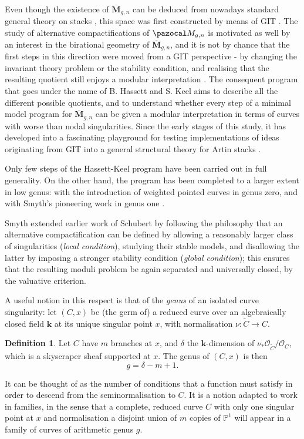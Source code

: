 \documentclass[11pt]{amsart}
\newcommand{\PP}{\mathbb P}
\renewcommand{\k}{\mathbf k}
\newcommand{\OO}{\mathcal O}
\renewcommand{\to}{\rightarrow}
\theoremstyle{plain}
\theoremstyle{definition}
\newtheorem{dfn}[thm]{Definition}
\begin{document}
Even though the existence of $\overline{\mathbf M}_{g,n}$ can be deduced from nowadays standard general theory on stacks \cite{KM}, this space was first constructed by means of GIT \cite{Gieseker,GIT,BalSwi}. The study of alternative compactifications of $\pazocal M_{g,n}$ is motivated as well by an interest in the birational geometry of $\overline{\mathbf M}_{g,n}$, and it is not by chance that the first steps in this direction were moved from a GIT perspective - by changing the invariant theory problem or the stability condition, and realising that the resulting quotient still enjoys a modular interpretation \cite{Schubert,Hassettg2}. The consequent program that goes under the name of B. Hassett and S. Keel aims to describe all the different possible quotients, and to understand whether every step of a minimal model program for $\overline{\mathbf M}_{g,n}$ can be given a modular interpretation in terms of curves with worse than nodal singularities. Since the early stages of this study, it has developed into a fascinating playground for testing implementations of ideas originating from GIT into a general structural theory for Artin stacks \cite{AFS1,AFS2,AFS3,CTV}.

Only few steps of the Hassett-Keel program have been carried out in full generality. On the other hand, the program has been completed to a larger extent in low genus: with the introduction of weighted pointed curves \cite{Hassettweighted} in genus zero, and with Smyth's pioneering work in genus one \cite{SMY1,SMY2,SMY3}.

Smyth extended earlier work of Schubert by following the philosophy that an alternative compactification can be defined by allowing a reasonably larger class of singularities (\emph{local condition}), studying their stable models, and disallowing the latter by imposing a stronger stability condition (\emph{global condition}); this ensures that the resulting moduli problem be again separated and universally closed, by the valuative criterion.

A useful notion in this respect is that of the \emph{genus} of an isolated curve singularity: let $(C,x)$ be (the germ of) a reduced curve over an algebraically closed field $\k$ at its unique singular point $x$, with normalisation $\nu\colon\widetilde{C}\to C$.
\begin{dfn}\label{def:genus}
Let $C$ have $m$ branches at $x$, and $\delta$ the $\k$-dimension of $\nu_*\OO_{\widetilde C}/\OO_C$, which is a skyscraper sheaf supported at $x$. The genus of $(C,x)$ is then
\[g=\delta-m+1.\] 
\end{dfn}
It can be thought of as the number of conditions that a function must satisfy in order to descend from the seminormalisation to $C$. It is a notion adapted to work in families, in the sense that a complete, reduced curve $C$ with only one singular point at $x$ and normalisation a disjoint union of $m$ copies of $\PP^1$ will appear in a family of curves of arithmetic genus $g$.
\end{document}
